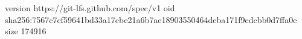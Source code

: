 version https://git-lfs.github.com/spec/v1
oid sha256:7567c7cf59641bd33a17cbe21a6b7ae18903550464deba171f9edcbb0d7ffa0e
size 174916
